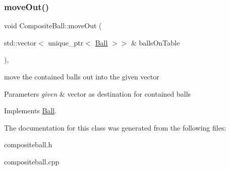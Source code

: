 \mbox{\label{class_composite_ball_a2bf10829db0790d8a42529fafaf8c7b4}} 
\subsubsection{\texorpdfstring{move\+Out()}{moveOut()}}
{\footnotesize\ttfamily void Composite\+Ball\+::move\+Out (\begin{DoxyParamCaption}\item[{std\+::vector$<$ unique\+\_\+ptr$<$ \mbox{\hyperlink{class_ball}{Ball}} $>$$>$ \&}]{balls\+On\+Table }\end{DoxyParamCaption})\hspace{0.3cm}{\ttfamily [override]}, {\ttfamily [virtual]}}



move the contained balls out into the given vector 


\begin{DoxyParams}{Parameters}
{\em given} & vector as destination for contained balls \\
\hline
\end{DoxyParams}


Implements \mbox{\hyperlink{class_ball_a7d3b8c70ee8c61db73692a4d44bbf933}{Ball}}.



The documentation for this class was generated from the following files\+:\begin{DoxyCompactItemize}
\item 
compositeball.\+h\item 
compositeball.\+cpp\end{DoxyCompactItemize}
